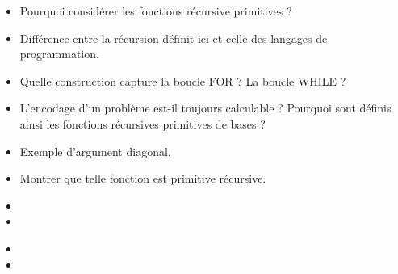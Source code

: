 \documentclass{agregfiche}
\begin{document}
\secquestionsclassiques

\begin{itemize}
	\item Pourquoi considérer les fonctions récursive primitives ?
	\item Différence entre la récursion définit ici et celle des langages de programmation.
    \item Quelle construction capture la boucle FOR ? La boucle WHILE ?
	\item L'encodage d'un problème est-il toujours calculable ? Pourquoi sont définis ainsi les fonctions récursives primitives de bases ?
	\item Exemple d'argument diagonal.
	\item Montrer que telle fonction est primitive récursive.
	
\end{itemize}
\secreferences

\begin{itemize}
\item 
\item 
\end{itemize}

\secdev

\begin{itemize}
    \item  
    \item 
\end{itemize}
\end{document}
